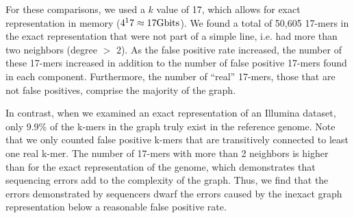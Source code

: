 \documentclass[12pt]{article} \usepackage{simplemargins}
\begin{document}
\begin{table}
\caption{An exact \emph{E. coli} genome representation of 17-mers was compared with 
two inexact ones as well as an exact and two inexact representations of an Illumina 
\emph{E. coli} dataset.}
\end{table}

For these comparisons, we used a $k$ value of 17, which allows for exact
representation in memory ($4^17 \approx 17 {\rm Gbits}$). We found 
a total of 50,605 17-mers in the exact representation that were not
part of a simple line, i.e. had more 
than two neighbors (degree $>$ 2). As the false positive rate 
increased, the number of these 
17-mers increased in addition to the number of 
false positive 17-mers found in each component. Furthermore, the number of 
``real'' 17-mers, those that are not false positives, 
comprise the majority of the graph.

In contrast, when we examined an exact representation of an Illumina
dataset, only 9.9\% of the k-mers in the graph truly exist in the
reference genome. Note that we only counted false positive k-mers that
are transitively connected to least one real k-mer. The
number of 17-mers with more than 2 neighbors is higher
than for the exact representation of the genome, which demonstrates
that sequencing errors add to the complexity of the
graph. Thus, we find that the errors demonstrated by sequencers dwarf
the errors caused by the inexact graph representation below a
reasonable false positive rate.
\end{document}
